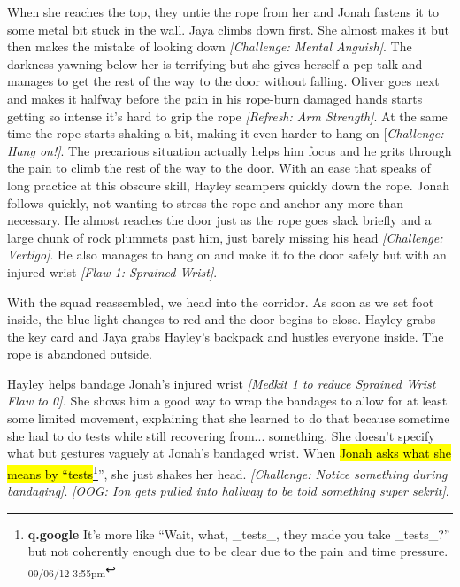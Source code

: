 When she reaches the top, they untie the rope from her and Jonah fastens it to some metal bit stuck in the wall.  Jaya climbs down first.  She almost makes it but then makes the mistake of looking down \textit{{[}Challenge: Mental Anguish{]}}.  The darkness yawning below her is terrifying but she gives herself a pep talk and manages to get the rest of the way to the door without falling.  Oliver goes next and makes it halfway before the pain in his rope-burn damaged hands starts getting so intense it's hard to grip the rope \textit{{[}Refresh: Arm Strength{]}}.  At the same time the rope starts shaking a bit, making it even harder to hang on {[}\textit{Challenge: Hang on!{]}}.  The precarious situation actually helps him focus and he grits through the pain to climb the rest of the way to the door.   With an ease that speaks of long practice at this obscure skill, Hayley scampers quickly down the rope.  Jonah follows quickly, not wanting to stress the rope and anchor any more than necessary.  He almost reaches the door just as the rope goes slack briefly and a large chunk of rock plummets past him, just barely missing his head \textit{{[}Challenge: Vertigo{]}}.  He also manages to hang on and make it to the door safely but with an injured wrist \textit{{[}Flaw 1: Sprained Wrist{]}}.






With the squad reassembled, we head into the corridor.  As soon as we set foot inside, the blue light changes to red and the door begins to close.  Hayley grabs the key card and Jaya grabs Hayley's backpack and hustles everyone inside.  The rope is abandoned outside.



Hayley helps bandage Jonah's injured wrist \textit{{[}Medkit 1 to reduce Sprained Wrist Flaw to 0{]}.}  She shows him a good way to wrap the bandages to allow for at least some limited movement, explaining that she learned to do that because sometime she had to do tests while still recovering from... something.  She doesn't specify what but gestures vaguely at Jonah's bandaged wrist.  When \hl{Jonah asks what she means by ``tests}\footnote{\textbf{q.google }It's more like ``Wait, what, \_tests\_, they made you take \_tests\_?'' but not coherently enough due to be clear due to the pain and time pressure. \textsubscript{09/06/12 3:55pm}}'', she just shakes her head. \textit{{[}Challenge: Notice something during bandaging{]}}.  \textit{{[}OOG: Ion gets pulled into hallway to be told something super sekrit{]}}.



